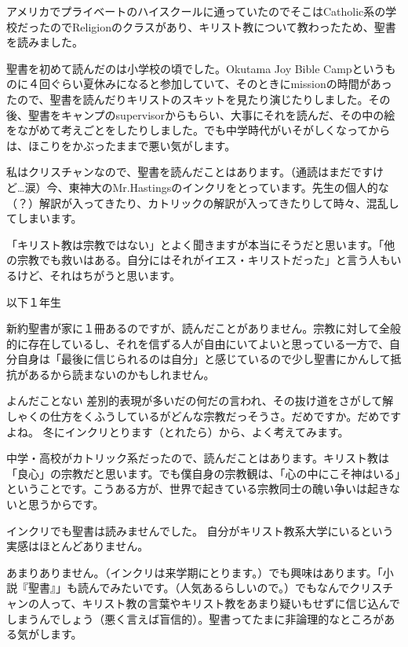 \item
アメリカでプライベートのハイスクールに通っていたのでそこはCatholic系の学校だったのでReligionのクラスがあり、キリスト教について教わったため、聖書を読みました。

\item
聖書を初めて読んだのは小学校の頃でした。Okutama Joy Bible Campというものに４回ぐらい夏休みになると参加していて、そのときにmissionの時間があったので、聖書を読んだりキリストのスキットを見たり演じたりしました。その後、聖書をキャンプのsupervisorからもらい、大事にそれを読んだ、その中の絵をながめて考えごとをしたりしました。でも中学時代がいそがしくなってからは、ほこりをかぶったままで悪い気がします。

\item
私はクリスチャンなので、聖書を読んだことはあります。（通読はまだですけど…涙）今、東神大のMr.Hastingsのインクリをとっています。先生の個人的な（？）解訳が入ってきたり、カトリックの解訳が入ってきたりして時々、混乱してしまいます。

「キリスト教は宗教ではない」とよく聞きますが本当にそうだと思います。「他の宗教でも救いはある。自分にはそれがイエス・キリストだった」と言う人もいるけど、それはちがうと思います。

\smallskip
以下１年生

\item
新約聖書が家に１冊あるのですが、読んだことがありません。宗教に対して全般的に存在しているし、それを信ずる人が自由にいてよいと思っている一方で、自分自身は「最後に信じられるのは自分」と感じているので少し聖書にかんして抵抗があるから読まないのかもしれません。

\item
よんだことない
差別的表現が多いだの何だの言われ、その抜け道をさがして解しゃくの仕方をくふうしているがどんな宗教だっそうさ。だめですか。だめですよね。
冬にインクリとります（とれたら）から、よく考えてみます。

\item
中学・高校がカトリック系だったので、読んだことはあります。キリスト教は「良心」の宗教だと思います。でも僕自身の宗教観は、「心の中にこそ神はいる」ということです。こうある方が、世界で起きている宗教同士の醜い争いは起きないと思うからです。

\item
インクリでも聖書は読みませんでした。
自分がキリスト教系大学にいるという実感はほとんどありません。

\item
あまりありません。（インクリは来学期にとります。）でも興味はあります。「小説『聖書』」も読んでみたいです。（人気あるらしいので。）でもなんでクリスチャンの人って、キリスト教の言葉やキリスト教をあまり疑いもせずに信じ込んでしまうんでしょう（悪く言えば盲信的）。聖書ってたまに非論理的なところがある気がします。

